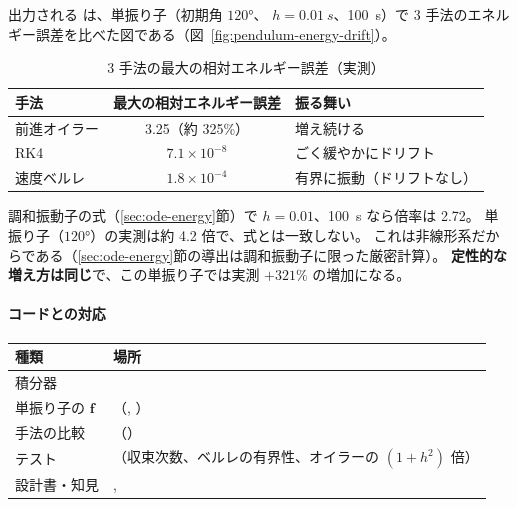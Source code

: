 出力される  は、単振り子（初期角 $\ang{120}$、
$h=\qty{0.01}{s}$、\qty{100}{s}）で 3 手法のエネルギー誤差を比べた図である（図~\ref{fig:pendulum-energy-drift}）。


\begin{table}[htbp]
\centering
\caption{3 手法の最大の相対エネルギー誤差（実測）}\label{tab:energy-measured}
\begin{tabular}{lcl}
\toprule
手法 & 最大の相対エネルギー誤差 & 振る舞い \\
\midrule
前進オイラー & 3.25（約 325\%） & 増え続ける \\
RK4          & $7.1\times10^{-8}$ & ごく緩やかにドリフト \\
速度ベルレ   & $1.8\times10^{-4}$ & 有界に振動（ドリフトなし） \\
\bottomrule
\end{tabular}
\end{table}

調和振動子の式（\ref{sec:ode-energy}節）で $h=0.01$、\qty{100}{s} なら倍率は 2.72。
単振り子（$\ang{120}$）の実測は約 4.2 倍で、式とは一致しない。
これは非線形系だからである（\ref{sec:ode-energy}節の導出は調和振動子に限った厳密計算）。
\textbf{定性的な増え方は同じ}で、この単振り子では実測 $+321\%$ の増加になる。

\paragraph{コードとの対応}
\begin{center}
\begin{tabularx}{\linewidth}{@{}lL@{}}
\toprule
種類 & 場所 \\
\midrule
積分器 &  \\
単振り子の $\mathbf f$ & （, ） \\
手法の比較 & （） \\
テスト & （収束次数、ベルレの有界性、オイラーの $(1+h^2)$ 倍） \\
設計書・知見 & ,  \\
\bottomrule
\end{tabularx}
\end{center}

